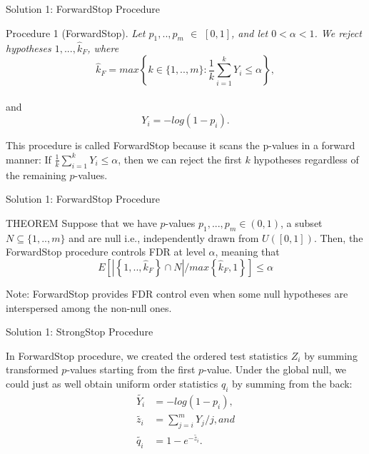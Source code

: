 \documentclass{beamer}
\begin{document}
\begin{frame}[t]{Solution 1: ForwardStop Procedure }\vspace{10pt}
\begin{block}{Procedure 1 (ForwardStop). }
	\textit{Let $p_1,..,p_m$ $\in$ $[0,1]$, and let $0 < \alpha <1$. We reject hypotheses $1,..., \hat{k}_F$, where}
	$$  \hat{k}_F = max \left\{ k \in \{1,..,m\} : \frac{1}{k}\sum_{i=1}^k Y_i \leq \alpha \right\},$$ \\
	and $$Y_i = -log(1-p_i). $$
\end{block}

\vspace{10pt}

This procedure is called ForwardStop because it scans the p-values in a forward manner: If $\frac{1}{k}\sum_{i=1}^k Y_i \leq \alpha$, then we can reject the first $k$ hypotheses regardless of the
remaining $p$-values.

\end{frame}


\begin{frame}[t]{Solution 1: ForwardStop Procedure }\vspace{10pt}
\begin{block}{THEOREM}
Suppose that we have $p$-values $p_1,...,p_m \in (0,1)$, a subset $N \subseteq \{1,..,m\}$ and are null i.e., independently drawn from $U([0, 1])$. Then, the ForwardStop procedure controls FDR at level $\alpha$, meaning that
$$ E \left[\left| \left\{ 1,..,\hat{k}_F\right\}  \cap N \right| \bigg/ max\left\{\hat{k}_F,1 \right\}\right] \leq \alpha $$	
\end{block}
Note: ForwardStop provides FDR control even when some null hypotheses are interspersed among the non-null ones.
\end{frame}

\begin{frame}[t]{Solution 1: StrongStop Procedure }\vspace{10pt}

In ForwardStop procedure, we created the ordered test statistics $Z_i$ by summing transformed $p$-values starting from the first $p$-value. Under the global null, we could just as well obtain uniform order statistics $q_i$ by summing from the back:
\begin{align*}
\tilde{Y_i} &= -log(1-p_i), \\
\tilde{z_i} &=\sum_{j=i}^{m}Y_j/j, and  \\
\tilde{q_i} &= 1- e^{-\tilde{z_i}}. 
\end{align*}

\end{frame}
\end{document}

